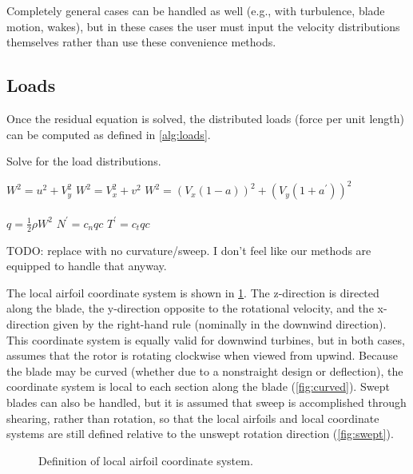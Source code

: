 Completely general cases can be handled as well (e.g., with turbulence, blade motion, wakes), but in these cases the user must input the velocity distributions themselves rather than use these convenience methods.


\subsection{Loads}

Once the residual equation is solved, the distributed loads (force per unit length) can be computed as defined in \cref{alg:loads}.
\begin{algorithm}[htbp]
\caption{Solve for the load distributions.}
\begin{algorithmic}
\State $W^2 = u^2 + V_y^2$
\State $W^2 = V_x^2 + v^2$
\Else
\State $W^2 = (V_x(1 - a))^2 + (V_y(1 + a^\prime))^2$
\EndIf
\\
\\
\State $q = \frac{1}{2}\rho W^2$
\State $N^\prime = c_n q c$
\State $T^\prime = c_t q c$

\end{algorithmic}
\label{alg:loads}
\end{algorithm}

TODO: replace with no curvature/sweep.  I don't feel like our methods are equipped to handle that anyway.

The local airfoil coordinate system is shown in \cref{fig:csys}.  The z-direction is directed along the blade, the y-direction opposite to the rotational velocity, and the x-direction given by the right-hand rule (nominally in the downwind direction).  This coordinate system is equally valid for downwind turbines, but in both cases, assumes that the rotor is rotating clockwise when viewed from upwind.  Because the blade may be curved (whether due to a nonstraight design or deflection), the coordinate system is local to each section along the blade (\cref{fig:curved}).  Swept blades can also be handled, but it is assumed that sweep is accomplished through shearing, rather than rotation, so that the local airfoils and local coordinate systems are still defined relative to the unswept rotation direction (\cref{fig:swept}).

\begin{figure}[htbp]
\centering
 \qquad
 \caption{Definition of local airfoil coordinate system.}
 \label{fig:csys}
\end{figure}

